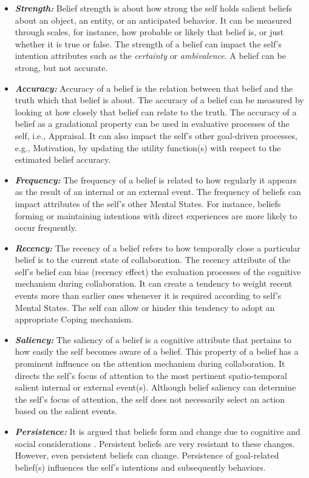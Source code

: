 \documentclass[letterpaper]{article}
\begin{document}
\begin{itemize}
  \item \textbf{\textit{Strength:}} Belief strength is about how strong the self
  holds salient beliefs about an object, an entity, or an anticipated behavior.
  It can be measured through scales, for instance, how probable or likely that
  belief is, or just whether it is true or false. The strength of a belief can
  impact the self's intention attributes such as the \textit{certainty} or
  \textit{ambivalence}. A belief can be strong, but not accurate.
  
  \item \textbf{\textit{Accuracy:}} Accuracy of a belief is the relation between
  that belief and the truth which that belief is about. The accuracy of a belief
  can be measured by looking at how closely that belief can relate to the truth.
  The accuracy of a belief as a gradational property can be used in evaluative
  processes of the self, i.e., Appraisal. It can also impact the self's other
  goal-driven processes, e.g., Motivation, by updating the utility function(s)
  with respect to the estimated belief accuracy.
  
  \item \textbf{\textit{Frequency:}} The frequency of a belief is related to how
  regularly it appears as the result of an internal or an external event. The
  frequency of beliefs can impact attributes of the self's other Mental States.
  For instance, beliefs forming or maintaining intentions with direct
  experiences are more likely to occur frequently.
  
  \item \textbf{\textit{Recency:}} The recency of a belief refers to how
  temporally close a particular belief is to the current state of collaboration.
  The recency attribute of the self's belief can bias (recency effect) the
  evaluation processes of the cognitive mechanism during collaboration. It can
  create a tendency to weight recent events more than earlier ones whenever it
  is required according to self's Mental States. The self can allow or hinder
  this tendency to adopt an appropriate Coping mechanism.
  
  \item \textbf{\textit{Saliency:}} The saliency of a belief is a cognitive
  attribute that pertains to how easily the self becomes aware of a belief.
  This property of a belief has a prominent influence on the attention mechanism
  during collaboration. It directs the self's focus of attention to the most
  pertinent spatio-temporal salient internal or external event(s). Although
  belief saliency can determine the self's focus of attention, the self does not
  necessarily select an action based on the salient events.
  
  \item \textbf{\textit{Persistence:}} It is argued that beliefs form and change
  due to cognitive and social considerations \cite{carley:belief-persistence}.
  Persistent beliefs are very resistant to these changes. However, even
  persistent beliefs can change. Persistence of goal-related belief(s)
  influences the self's intentions and subsequently behaviors.
\end{itemize}
\end{document}
